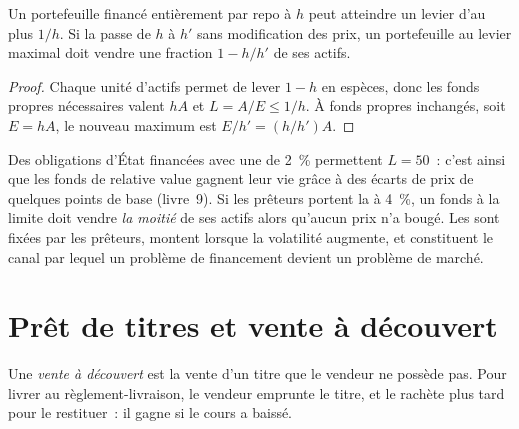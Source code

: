 \begin{proposition}\label{prop:m1:financing:haircut}
Un portefeuille financé entièrement par repo à  $h$ peut atteindre un levier
d'au plus $1/h$. Si la  passe de $h$ à $h'$ sans modification des
prix, un portefeuille au levier maximal doit vendre une fraction $1 - h/h'$ de
ses actifs.
\end{proposition}
\begin{proof}
Chaque unité d'actifs permet de lever $1-h$ en espèces, donc les fonds propres nécessaires valent $hA$ et
$L = A/E \le 1/h$. À fonds propres inchangés, soit $E = hA$, le nouveau maximum est
$E/h' = (h/h')A$.
\end{proof}

\begin{example}\label{ex:m1:financing:doubling}
Des obligations d'État financées avec une  de 2~\% permettent $L = 50$~: c'est ainsi
que les fonds de relative value gagnent leur vie grâce à des écarts de prix de
quelques points de base (livre~9). Si les prêteurs portent la  à 4~\%, un fonds
à la limite doit vendre \emph{la moitié} de ses actifs alors qu'aucun prix n'a bougé. Les 
sont fixées par les prêteurs, montent lorsque la volatilité augmente, et constituent le canal
par lequel un problème de financement devient un problème de marché.
\end{example}

\section{Prêt de titres et vente à découvert}

\begin{definition}\label{def:m1:financing:short}
Une \emph{vente à découvert} est la vente d'un titre que le vendeur
ne possède pas. Pour livrer au règlement-livraison, le vendeur emprunte le titre, et
le rachète plus tard pour le restituer~: il gagne si le cours a baissé.
\end{definition}

